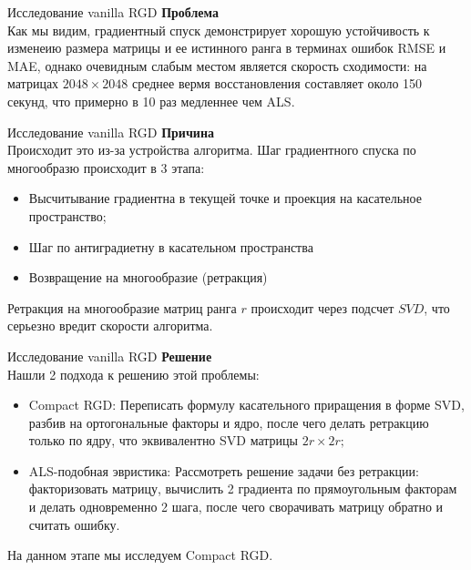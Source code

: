 \documentclass[aspectratio=169,xcolor=dvipsnames]{beamer}
\begin{document}
\begin{frame}{Исследование vanilla RGD}
    \small
    \textbf{Проблема} \\[30pt]
    Как мы видим, градиентный спуск демонстрирует хорошую устойчивость к изменеию размера матрицы и ее истинного ранга
    в терминах ошибок RMSE и MAE, однако очевидным слабым местом является скорость сходимости: на матрицах $2048\times 2048$
    среднее вермя восстановления составляет около 150 секунд, что примерно в 10 раз медленнее чем ALS.

\end{frame}
\begin{frame}{Исследование vanilla RGD}
    \small
    \textbf{Причина} \\[20pt]
    Происходит это из-за устройства алгоритма. Шаг градиентного спуска по многообразю происходит в 3 этапа:
    \begin{itemize}
        \item Высчитывание градиентна в текущей точке и проекция на касательное пространство;
        \item Шаг по антиградиетну в касательном пространства
        \item Возвращение на многообразие (ретракция)
    \end{itemize}
    Ретракция на многообразие матриц ранга $r$ происходит через подсчет $SVD$, что серьезно вредит
    скорости алгоритма.
\end{frame}
\begin{frame}{Исследование vanilla RGD}
    \small
    \textbf{Решение} \\[20pt]
    Нашли 2 подхода к решению этой проблемы:
    \begin{itemize}
        \item Compact RGD: Переписать формулу касательного приращения в форме SVD, разбив на ортогональные факторы и ядро, после чего делать ретракцию только по ядру, что эквивалентно SVD матрицы $2r\times 2r;$
        \item ALS-подобная эвристика: Рассмотреть решение задачи без ретракции: факторизовать матрицу, вычислить 2 градиента по прямоугольным факторам и делать одновременно 2 шага, после чего сворачивать матрицу обратно и считать ошибку.
    \end{itemize}
    На данном этапе мы исследуем Compact RGD.
\end{frame}
\end{document}
